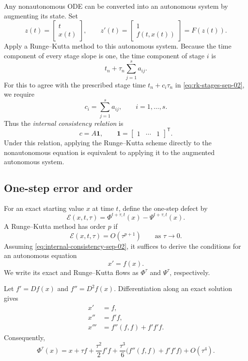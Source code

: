 Any nonautonomous ODE can be converted into an autonomous system by
augmenting its state. Set
\[
  z(t)=\begin{bmatrix}t\\x(t)\end{bmatrix},
  \qquad
  z'(t)=
  \begin{bmatrix}1\\f(t,x(t))\end{bmatrix}
  =F(z(t)).
\]
Apply a Runge--Kutta method to this autonomous system. Because the time
component of every stage slope is one, the time component of stage
\(i\) is
\[
  t_n+\tau_n\sum_{j=1}^s a_{ij}.
\]
For this to agree with the prescribed stage time
\(t_n+c_i\tau_n\) in \eqref{eq:rk-stages-sep-02}, we require
\[
  c_i=\sum_{j=1}^s a_{ij},
  \qquad i=1,\ldots,s.
\]
Thus the \emph{internal consistency relation} is
\begin{equation}\label{eq:internal-consistency-sep-02}
  c=A\mathbf{1},
  \qquad
  \mathbf{1}=\begin{bmatrix}1&\cdots&1\end{bmatrix}^{\mathsf T}.
\end{equation}
Under this relation, applying the Runge--Kutta scheme directly to the
nonautonomous equation is equivalent to applying it to the augmented
autonomous system.

\subsection{One-step error and order}

For an exact starting value \(x\) at time \(t\), define the one-step
defect by
\begin{equation}\label{eq:one-step-defect-sep-02}
  \mathcal{E}(x,t,\tau)
  =\Phi^{t+\tau,t}(x)-\Psi^{t+\tau,t}(x).
\end{equation}
A Runge--Kutta method has order \(p\) if
\[
  \mathcal{E}(x,t,\tau)=O(\tau^{p+1})
  \qquad\text{as }\tau\to0.
\]
Assuming \eqref{eq:internal-consistency-sep-02}, it suffices to derive
the conditions for an autonomous equation
\[
  x'=f(x).
\]
We write its exact and Runge--Kutta flows as \(\Phi^\tau\) and
\(\Psi^\tau\), respectively.

Let \(f'=Df(x)\) and \(f''=D^2f(x)\). Differentiation along an exact
solution gives
\begin{align*}
  x'&=f,\\
  x''&=f'f,\\
  x'''&=f''(f,f)+f'f'f.
\end{align*}
Consequently,
\begin{equation}\label{eq:exact-flow-third-order-sep-02}
  \Phi^\tau(x)
  =x+\tau f+\frac{\tau^2}{2}f'f
   +\frac{\tau^3}{6}\bigl(f''(f,f)+f'f'f\bigr)
   +O(\tau^4).
\end{equation}

